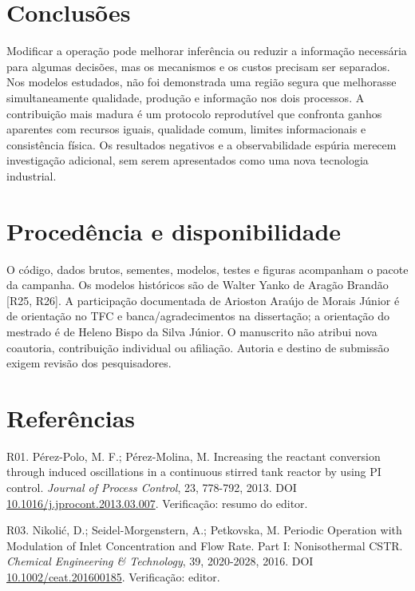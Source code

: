 \documentclass[
  11pt,
  letterpaper,
]{article}
\begin{document}
\hypertarget{conclusuxf5es}{%
\section{Conclusões}\label{conclusuxf5es}}

Modificar a operação pode melhorar inferência ou reduzir a informação
necessária para algumas decisões, mas os mecanismos e os custos precisam
ser separados. Nos modelos estudados, não foi demonstrada uma região
segura que melhorasse simultaneamente qualidade, produção e informação
nos dois processos. A contribuição mais madura é um protocolo
reprodutível que confronta ganhos aparentes com recursos iguais,
qualidade comum, limites informacionais e consistência física. Os
resultados negativos e a observabilidade espúria merecem investigação
adicional, sem serem apresentados como uma nova tecnologia industrial.

\hypertarget{proceduxeancia-e-disponibilidade}{%
\section{Procedência e
disponibilidade}\label{proceduxeancia-e-disponibilidade}}

O código, dados brutos, sementes, modelos, testes e figuras acompanham o
pacote da campanha. Os modelos históricos são de Walter Yanko de Aragão
Brandão {[}R25, R26{]}. A participação documentada de Arioston Araújo de
Morais Júnior é de orientação no TFC e banca/agradecimentos na
dissertação; a orientação do mestrado é de Heleno Bispo da Silva Júnior.
O manuscrito não atribui nova coautoria, contribuição individual ou
afiliação. Autoria e destino de submissão exigem revisão dos
pesquisadores.

\hypertarget{referuxeancias}{%
\section{Referências}\label{referuxeancias}}

R01. Pérez-Polo, M. F.; Pérez-Molina, M. Increasing the reactant
conversion through induced oscillations in a continuous stirred tank
reactor by using PI control. \emph{Journal of Process Control}, 23,
778-792, 2013. DOI
\href{https://doi.org/10.1016/j.jprocont.2013.03.007}{10.1016/j.jprocont.2013.03.007}.
Verificação: resumo do editor.

R03. Nikolić, D.; Seidel-Morgenstern, A.; Petkovska, M. Periodic
Operation with Modulation of Inlet Concentration and Flow Rate. Part I:
Nonisothermal CSTR. \emph{Chemical Engineering \& Technology}, 39,
2020-2028, 2016. DOI
\href{https://doi.org/10.1002/ceat.201600185}{10.1002/ceat.201600185}.
Verificação: editor.
\end{document}
